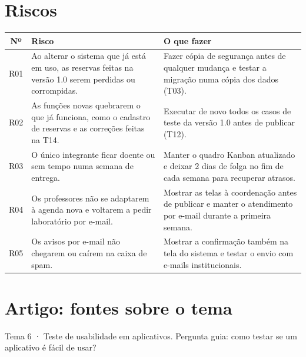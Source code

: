 \documentclass[a4paper,12pt]{article}
\begin{document}
\section{Riscos}

\begin{xltabular}{\linewidth}{|c|Y|Y|}
  \hline
  \textbf{Nº} & \textbf{Risco} & \textbf{O que fazer} \\ \hline
  R01 & Ao alterar o sistema que já está em uso, as reservas feitas na versão 1.0 serem perdidas ou corrompidas. & Fazer cópia de segurança antes de qualquer mudança e testar a migração numa cópia dos dados (T03). \\ \hline
  R02 & As funções novas quebrarem o que já funciona, como o cadastro de reservas e as correções feitas na T14. & Executar de novo todos os casos de teste da versão 1.0 antes de publicar (T12). \\ \hline
  R03 & O único integrante ficar doente ou sem tempo numa semana de entrega. & Manter o quadro Kanban atualizado e deixar 2 dias de folga no fim de cada semana para recuperar atrasos. \\ \hline
  R04 & Os professores não se adaptarem à agenda nova e voltarem a pedir laboratório por e-mail. & Mostrar as telas à coordenação antes de publicar e manter o atendimento por e-mail durante a primeira semana. \\ \hline
  R05 & Os avisos por e-mail não chegarem ou caírem na caixa de spam. & Mostrar a confirmação também na tela do sistema e testar o envio com e-mails institucionais. \\ \hline
\end{xltabular}

\section{Artigo: fontes sobre o tema}

Tema 6 · Teste de usabilidade em aplicativos. Pergunta guia: como
testar se um aplicativo é fácil de usar?
\end{document}
